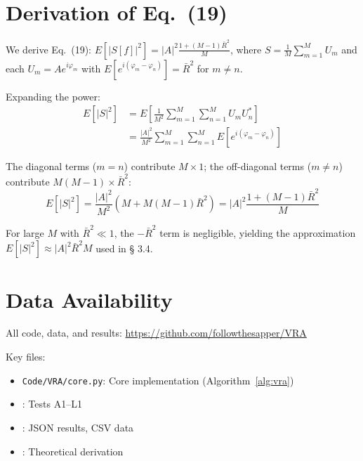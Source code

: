 \documentclass[10pt,twocolumn]{article}
\begin{document}
\section{Derivation of Eq.~(19)}

We derive Eq.~(19): $E[|S[f]|^2] = |A|^2 \frac{1 + (M{-}1)\bar{R}^2}{M}$, where $S = \frac{1}{M}\sum_{m=1}^M U_m$ and each $U_m = A e^{i\varphi_m}$ with $E[e^{i(\varphi_m - \varphi_n)}] = \bar{R}^2$ for $m \neq n$.

Expanding the power:
\begin{align}
E[|S|^2] &= E\left[\frac{1}{M^2} \sum_{m=1}^M \sum_{n=1}^M U_m U_n^*\right] \nonumber \\
&= \frac{|A|^2}{M^2} \sum_{m=1}^M \sum_{n=1}^M E[e^{i(\varphi_m - \varphi_n)}]
\end{align}

The diagonal terms ($m=n$) contribute $M \times 1$; the off-diagonal terms ($m \neq n$) contribute $M(M{-}1) \times \bar{R}^2$:
\begin{equation}
E[|S|^2] = \frac{|A|^2}{M^2} \left( M + M(M{-}1)\bar{R}^2 \right) = |A|^2 \frac{1 + (M{-}1)\bar{R}^2}{M}
\end{equation}

For large $M$ with $\bar{R}^2 \ll 1$, the ${-}\bar{R}^2$ term is negligible, yielding the approximation $E[|S|^2] \approx |A|^2 \bar{R}^2 M$ used in § 3.4.

\section{Data Availability}

All code, data, and results: \url{https://github.com/followthesapper/VRA}

Key files:
{\small
\begin{itemize}
\item \texttt{Code/VRA/core.py}: Core implementation (Algorithm~\ref{alg:vra})
\item {}: Tests A1--L1
\item {}: JSON results, CSV data
\item {}: Theoretical derivation
\end{itemize}
}
\end{document}

